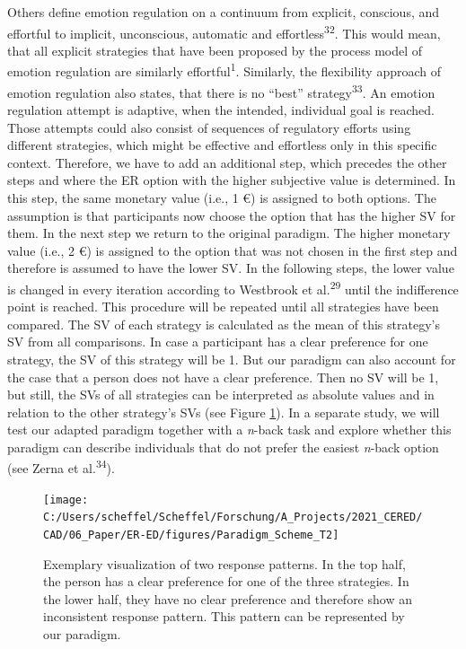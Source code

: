 \documentclass[
  english,
  man,floatsintext]{apa6}
\begin{document}
Others define emotion regulation on a continuum from explicit, conscious, and effortful to implicit, unconscious, automatic and effortless\textsuperscript{32}.
This would mean, that all explicit strategies that have been proposed by the process model of emotion regulation are similarly effortful\textsuperscript{1}.
Similarly, the flexibility approach of emotion regulation also states, that there is no ``best'' strategy\textsuperscript{33}.
An emotion regulation attempt is adaptive, when the intended, individual goal is reached. Those attempts could also consist of sequences of regulatory efforts using different strategies, which might be effective and effortless only in this specific context.
Therefore, we have to add an additional step, which precedes the other steps and where the ER option with the higher subjective value is determined.
In this step, the same monetary value (i.e., 1 €) is assigned to both options.
The assumption is that participants now choose the option that has the higher SV for them.
In the next step we return to the original paradigm.
The higher monetary value (i.e., 2 €) is assigned to the option that was not chosen in the first step and therefore is assumed to have the lower SV.
In the following steps, the lower value is changed in every iteration according to Westbrook et al.\textsuperscript{29} until the indifference point is reached.
This procedure will be repeated until all strategies have been compared.
The SV of each strategy is calculated as the mean of this strategy's SV from all comparisons.
In case a participant has a clear preference for one strategy, the SV of this strategy will be 1.
But our paradigm can also account for the case that a person does not have a clear preference.
Then no SV will be 1, but still, the SVs of all strategies can be interpreted as absolute values and in relation to the other strategy's SVs (see Figure \ref{fig:ResponsePatterns}).
In a separate study, we will test our adapted paradigm together with a \emph{n}-back task and explore whether this paradigm can describe individuals that do not prefer the easiest \emph{n}-back option (see Zerna et al.\textsuperscript{34}).

\begin{figure}
\texttt{[image: C:/Users/scheffel/Scheffel/Forschung/A\_Projects/2021\_CERED/CAD/06\_Paper/ER-ED/figures/Paradigm\_Scheme\_T2]} \caption{Exemplary visualization of two response patterns. In the top half, the person has a clear preference for one of the three strategies. In the lower half, they have no clear preference and therefore show an inconsistent response pattern. This pattern can be represented by our paradigm.}\label{fig:ResponsePatterns}
\end{figure}
\end{document}
